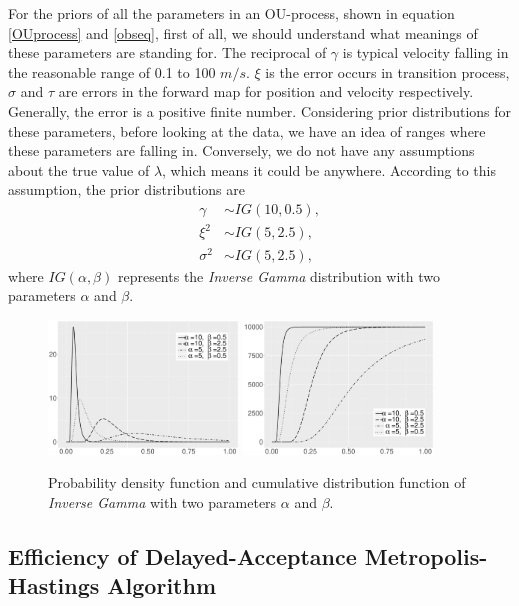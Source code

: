 For the priors of all the parameters in an OU-process, shown in equation \eqref{OUprocess} and \eqref{obseq}, first of all, we should understand what meanings of these parameters are standing for. The reciprocal of $\gamma$ is typical velocity falling in the reasonable range of 0.1 to 100 $m/s$. $\xi$ is the error occurs in transition process, $\sigma$ and $\tau$ are errors in the forward map for position and velocity respectively. Generally, the error is a positive finite number. Considering prior distributions for these parameters, before looking at the data, we have an idea of ranges where these parameters are falling in. Conversely, we do not have any assumptions about the true value of $\lambda$, which means it could be anywhere. According to this assumption, the prior distributions are 
\begin{align}
\gamma   &\sim IG(10,0.5),\\
\xi^2        &\sim IG(5,2.5),\\
\sigma^2 &\sim IG(5,2.5),
\end{align}
where $IG(\alpha,\beta)$ represents the \textit{Inverse Gamma} distribution with two parameters $\alpha$ and $\beta$. 
\begin{figure}[h]
\centering
\includegraphics[width=0.45\textwidth]{Chapters/05MCMCOU/plots/ggIGPDF_Final.pdf}
\includegraphics[width=0.45\textwidth]{Chapters/05MCMCOU/plots/ggIGCDF_Final.pdf}
\caption{Probability density function and cumulative distribution function of \textit{Inverse Gamma} with two parameters $\alpha$ and $\beta$. }
\label{IGPDFCDF}
\end{figure}


\subsection{Efficiency of Delayed-Acceptance Metropolis-Hastings Algorithm}

